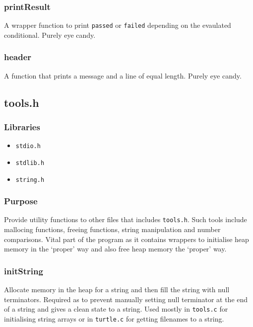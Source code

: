 \documentclass[a4paper, 12pt, titlepage]{article}
\newcommand{\code}[1]{\small\texttt{#1}\normalsize}
\begin{document}
\subsubsection{printResult}

A wrapper function to print \code{passed} or \code{failed} depending on the
evaulated conditional. Purely eye candy.

\subsubsection{header}

A function that prints a message and a line of equal length. Purely eye candy.

\pagebreak
\subsection{tools.h}
\subsubsection{Libraries}

\begin{itemize}[label={--}, noitemsep]
    \item \code{stdio.h}
    \item \code{stdlib.h}
    \item \code{string.h}
\end{itemize}

\subsubsection{Purpose}

Provide utility functions to other files that includes \code{tools.h}. Such
tools include mallocing functions, freeing functions, string manipulation
and number comparisons. Vital part of the program as it contains wrappers to
initialise heap memory in the `proper' way and also free heap memory the
`proper' way.

\subsubsection{initString}

Allocate memory in the heap for a string and then fill the string with null
terminators. Required as to prevent manually setting null terminator at the
end of a string and gives a clean state to a string. Used mostly in
\code{tools.c} for initialising string arrays or in \code{turtle.c} for
getting filenames to a string.
\end{document}
